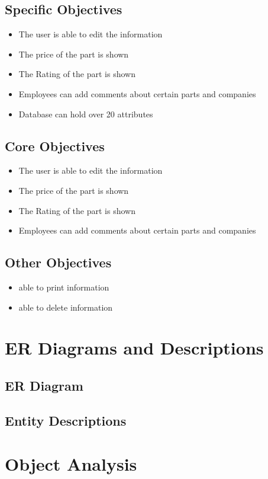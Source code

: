 \subsection{Specific Objectives}
\begin{itemize}
	\item The user is able to edit the information 
	\item The price of the part is shown
	\item The Rating of the part is shown
	\item Employees can add comments about certain parts and companies
	\item Database can hold over 20 attributes
\end{itemize}
\subsection{Core Objectives}
\begin{itemize}
	\item The user is able to edit the information 
	\item The price of the part is shown
	\item The Rating of the part is shown
	\item Employees can add comments about certain parts and companies
\end{itemize}
\subsection{Other Objectives}
\begin{itemize}
	\item able to print information
	\item able to delete information
\end{itemize}
\section{ER Diagrams and Descriptions}

\subsection{ER Diagram}

\subsection{Entity Descriptions}

\section{Object Analysis}

